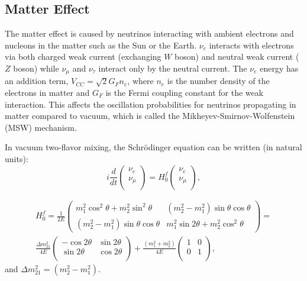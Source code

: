\subsection{Matter Effect}
The matter effect is caused by neutrinos interacting with ambient electrons and nucleons in the matter such as the Sun or the Earth. $\nu_e$ interacts with electrons via both charged weak current (exchanging $W$ boson) and neutral weak current ($Z$ boson) while $\nu_\mu$ and $\nu_\tau$ interact only by the neutral current. The $\nu_e$ energy has an addition term, $V_{CC} =\sqrt2G_Fn_e$, where $n_e$ is the number density of the electrons in matter and $G_F$ is the Fermi coupling constant for the weak interaction. This affects the oscillation probabilities for neutrinos propagating in matter compared to vacuum, which is called the Mikheyev-Smirnov-Wolfenstein (MSW) mechanism\cite{smirnov2016solar,smirnov2005msw}.

In vacuum two-flavor mixing, the Schr\"{o}dinger equation can be written (in natural units)\cite{xing2011neutrinos}:
\begin{equation}\label{eq:2flavor_simple}
	i\frac{d}{dt}\begin{pmatrix}
		\nu_e\\
		\nu_\mu\\
	\end{pmatrix}
	=
	H^f_0
	\begin{pmatrix}
		\nu_e\\
		\nu_\mu\\
	\end{pmatrix},
\end{equation}

\begin{equation} \label{eq:H0f}
\begin{aligned}
 H^f_0 = \frac{1}{2E}\begin{pmatrix}m^2_1\cos^2\theta+m^2_2\sin^2\theta & (m^2_2-m^2_1)\sin\theta\cos\theta \\ (m^2_2-m^2_1)\sin\theta\cos\theta & m^2_1\sin2\theta+m^2_2\cos^2\theta\end{pmatrix} =
\\
\frac{\Delta m_{21}^2}{4E}\begin{pmatrix}
	-\cos 2\theta & \sin 2\theta\\
	\sin 2\theta & \cos 2\theta\\
\end{pmatrix}+\frac{(m_1^2+m_2^2)}{4E}\begin{pmatrix}
	1 & 0\\
	0 &1\\
\end{pmatrix},
\end{aligned}
\end{equation}
and $\Delta m^2_{21}=(m^2_2 - m^2_1)$.

